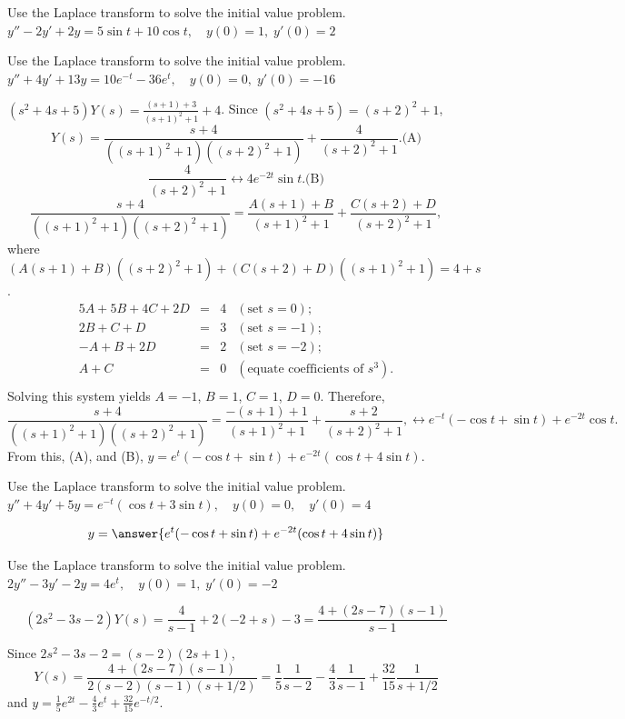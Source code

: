 \documentclass{ximera}
\begin{document}
\begin{problem}\label{exer:8.3.29} Use the Laplace transform to solve the initial value problem. $y''-2y'+2y=5\sin t+10\cos t, \quad  y(0)=1,\;
y'(0)=2$
\end{problem}

\begin{problem}\label{exer:8.3.30} Use the Laplace transform to solve the initial value problem. $y''+4y'+13y=10e^{-t}-36e^t, \quad  y(0)=0,\;
y'(0)=-16$

\begin{solution}
$(s^2+4s+5)Y(s)=\frac{(s+1)+3}{(s+1)^2+1}+4$.
Since $(s^2+4s+5)=(s+2)^2+1$,
$$
Y(s)=\frac{s+4}{((s+1)^2+1)((s+2)^2+1)}+\frac{4}{(s+2)^2+1}.
\text{(A)}
$$
$$
\frac{4}{(s+2)^2+1}
\leftrightarrow 4e^{-2t}\sin t.
\text{(B)}
$$
$$
\frac{s+4}{((s+1)^2+1)((s+2)^2+1)}=\frac{A(s+1)+B}{(s+1)^2+1}+\frac{C(s+2)+D}{(s+2)^2+1},
$$
where
$\left(A(s+1)+B\right)\left((s+2)^2+1\right)+
\left(C(s+2)+D\right)\left((s+1)^2+1\right)=4+s$.
$$
\begin{array}{rcll}
5A+5B+4C+2D&=&4&(\mbox{set }s=0);\\
2B+C+D&=&3&(\mbox{set }s=-1);\\
-A+B+2D&=&2&(\mbox{set }s=-2);\\
A+C&=&0&(\mbox{equate coefficients of }s^3).\\
\end{array}
$$
Solving this system yields $A=-1$, $B=1$, $C=1$, $D=0$. Therefore,
$$
\frac{s+4}{((s+1)^2+1)((s+2)^2+1)}=\frac{-(s+1)+1}{(s+1)^2+1}+\frac{s+2}{(s+2)^2+1},
\leftrightarrow e^{-t}(-\cos t+\sin t)+e^{-2t}\cos t.
$$
From this, (A), and (B),
$y=e^t(-\cos t+\sin t)+e^{-2t}(\cos t+4\sin t)$.
\end{solution}
\end{problem}

\begin{problem}\label{exer:8.3.31} Use the Laplace transform to solve the initial value problem. $y''+4y'+5y=e^{-t}(\cos t+3\sin t), \quad
y(0)=0,\quad y'(0)=4$

$$y=\answer{e^t(-\cos{t}+\sin{t})+e^{-2t}(\cos{t}+4\sin{t})}$$

\end{problem}

\begin{problem}\label{exer:8.3.32} Use the Laplace transform to solve the initial value problem. $2y''-3y'-2y=4e^t, \quad   y(0)=1,\;  y'(0)=-2$

\begin{solution}
$$
(2s^2-3s-2)Y(s)=\frac{4}{s-1}+2(-2+s)-3=\frac{4+(2s-7)(s-1)}{s-1}
$$

Since $2s^2-3s-2=(s-2)(2s+1)$,
$$
Y(s)=\frac{4+(2s-7)(s-1)}{2(s-2)(s-1)(s+1/2)}=
\frac{1}{5}\frac{1}{s-2}-\frac{4}{3}\frac{1}{s-1}+\frac{32}{15}\frac{1}{s+1/2}
$$
and
 $y=\frac{1}{5}e^{2t}-\frac{4}{3}e^t
+\frac{32}{15}e^{-t/2}$.
\end{solution}
\end{problem}
\end{document}
